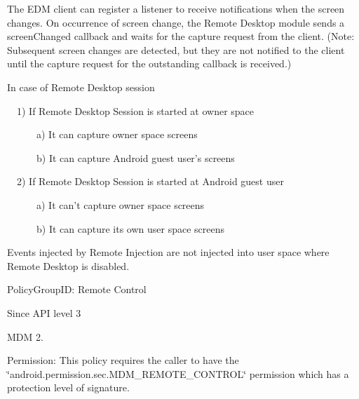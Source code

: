 \-The \-E\-D\-M client can register a listener to receive notifications when the screen changes. \-On occurrence of screen change, the \-Remote \-Desktop module sends a screen\-Changed callback and waits for the capture request from the client. (\-Note\-: \-Subsequent screen changes are detected, but they are not notified to the client until the capture request for the outstanding callback is received.)\par
 \par
 \-In case of \-Remote \-Desktop session\par
 ~~1) \-If \-Remote \-Desktop \-Session is started at owner space\par
 ~~~~~~a) \-It can capture owner space screens\par
 ~~~~~~b) \-It can capture \-Android guest user's screens\par


~~2) \-If \-Remote \-Desktop \-Session is started at \-Android guest user\par
 ~~~~~~a) \-It can't capture owner space screens\par
 ~~~~~~b) \-It can capture its own user space screens\par


\-Events injected by \-Remote \-Injection are not injected into user space where \-Remote \-Desktop is disabled. \par
 \begin{DoxyParagraph}{\-Policy\-Group\-I\-D\-: }
\-Remote \-Control 
\end{DoxyParagraph}
\begin{DoxySince}{\-Since}
\-A\-P\-I level 3 

\-M\-D\-M 2. 
\end{DoxySince}
\begin{DoxyParagraph}{\-Permission\-: }
\-This policy requires the caller to have the \char`\"{}android.\-permission.\-sec.\-M\-D\-M\-\_\-\-R\-E\-M\-O\-T\-E\-\_\-\-C\-O\-N\-T\-R\-O\-L\char`\"{} permission which has a protection level of signature. 
\end{DoxyParagraph}


